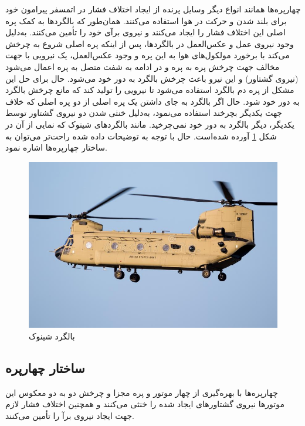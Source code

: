 چهارپره‌ها همانند انواع دیگر وسایل پرنده از ایجاد اختلاف فشار در اتمسفر پیرامون خود برای بلند شدن و حرکت در هوا استفاده می‌کنند. همان‌طور که بالگردها به کمک پره اصلی این اختلاف فشار را ایجاد می‌کنند و نیروی برآی
 خود را تأمین می‌کنند. به‌دلیل وجود نیروی عمل و عکس‌العمل در بالگردها، پس از اینکه پره اصلی شروع به چرخش می‌کند با برخورد مولکول‌های هوا به این پره و وجود عکس‌العمل، یک نیرویی با جهت مخالف جهت چرخش پره به پره و در ادامه به شفت متصل به پره اعمال می‌شود (نیروی گشتاور) و این نیرو باعث چرخش بالگرد به دور خود می‌شود. حال برای حل این مشکل از پره دم بالگرد استفاده می‌شود تا نیرویی را تولید کند که مانع چرخش بالگرد به دور خود شود. حال اگر بالگرد به جای داشتن یک پره اصلی از دو پره اصلی که خلاف جهت یکدیگر بچرخند استفاده می‌نمود، به‌دلیل خنثی شدن دو نیروی گشتاور توسط یکدیگر، دیگر بالگرد به دور خود نمی‌چرخید. مانند بالگردهای شینوک که نمایی از آن در شکل
\ref{chinook}
  آورده شده‌است. حال با توجه به توضیحات داده شده راحت‌تر می‌توان به ساختار چهارپره‌ها اشاره نمود.
\begin{figure}[H]
	\includegraphics[width=12cm]{../../Figures/introduction/boeing-ch-chinook.jpg}
	\centering
	\caption{بالگرد شینوک
		\cite{CH-47}}
	\label{chinook}
\end{figure}
\subsection{ساختار چهارپره}


چهارپره‌ها با بهره‌گیری از چهار موتور و پره مجزا و چرخش دو به دو معکوس این موتورها نیروی گشتاورهای ایجاد شده را خنثی می‌کنند و همچنین اختلاف فشار لازم جهت ایجاد نیروی برآ را تأمین می‌کنند.

